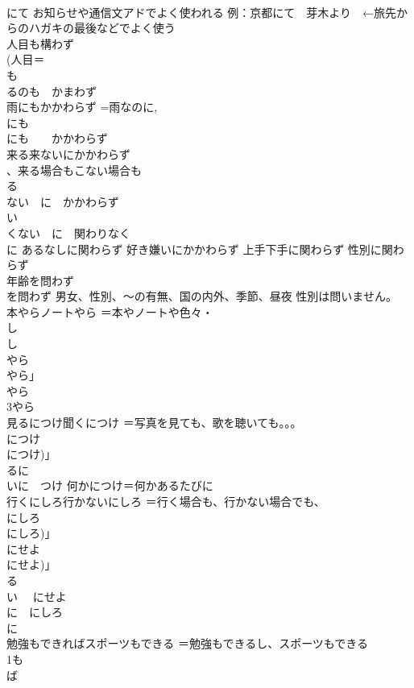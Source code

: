 \documentclass[8pt]{extreport}
\begin{document}
\begin{CJK}{UTF8}{min}
\\	にて お知らせや通信文アドでよく使われる 例：京都にて　芽木より　←旅先からのハガキの最後などでよく使う
\\	人目も構わず	
\\	(人目＝
\\	も 
\\	るのも　かまわず
\\	雨にもかかわらず	=雨なのに, 
\\	にも 
\\	にも　　かかわらず
\\	来る来ないにかかわらず	
\\	、来る場合もこない場合も 
\\	る
\\	ない　に　かかわらず 
\\	い
\\	くない　に　関わりなく 
\\	に あるなしに関わらず 好き嫌いにかかわらず 上手下手に関わらず 性別に関わらず
\\	年齢を問わず	
\\	を問わず 男女、性別、〜の有無、国の内外、季節、昼夜 性別は問いません。
\\	本やらノートやら	＝本やノートや色々・
\\	し
\\	し 
\\	やら
\\	やら」 
\\	やら 
\\	3やら
\\	見るにつけ聞くにつけ	＝写真を見ても、歌を聴いても。。。 
\\	につけ
\\	につけ)」 
\\	るに 
\\	いに　つけ 何かにつけ＝何かあるたびに
\\	行くにしろ行かないにしろ	＝行く場合も、行かない場合でも、
\\	にしろ
\\	にしろ)」 
\\	にせよ
\\	にせよ)」 
\\	る　 
\\	い　 にせよ 
\\	に　にしろ 
\\	に
\\	勉強もできればスポーツもできる	＝勉強もできるし、スポーツもできる 
\\	1も
\\	ば

\end{CJK}
\end{document}

